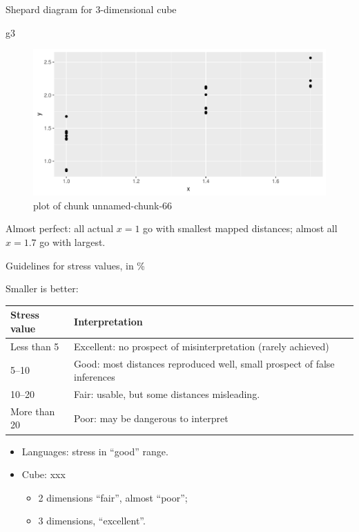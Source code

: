 \documentclass[ignorenonframetext,]{beamer}
\newenvironment{Shaded}{\begin{snugshade}}{\end{snugshade}}
\newcommand{\NormalTok}[1]{#1}
\begin{document}
\begin{frame}[fragile]{Shepard diagram for 3-dimensional cube}
\protect\hypertarget{shepard-diagram-for-3-dimensional-cube}{}

\begin{Shaded}
\begin{Highlighting}[]
\NormalTok{g3}
\end{Highlighting}
\end{Shaded}

\begin{figure}
\centering
\includegraphics{figure/unnamed-chunk-66-1.pdf}
\caption{plot of chunk unnamed-chunk-66}
\end{figure}

Almost perfect: all actual \(x=1\) go with smallest mapped distances;
almost all \(x=1.7\) go with largest.

\end{frame}

\begin{frame}{Guidelines for stress values, in \%}
\protect\hypertarget{guidelines-for-stress-values-in}{}

Smaller is better:

\begin{tabular}{lp{3in}}
Stress value & Interpretation \\
\hline
Less than 5 & Excellent: no prospect of misinterpretation (rarely achieved)\\
5--10 & Good: most distances reproduced well, small prospect of false inferences\\
10--20 & Fair: usable, but some distances misleading.\\
More than 20 & Poor: may be dangerous to interpret\\
\hline
\end{tabular}

\begin{itemize}
\item
  Languages: stress in ``good'' range.
\item
  Cube: xxx

  \begin{itemize}
  \item
    2 dimensions ``fair'', almost ``poor'';
  \item
    3 dimensions, ``excellent''.
  \end{itemize}
\end{itemize}

\end{frame}
\end{document}
